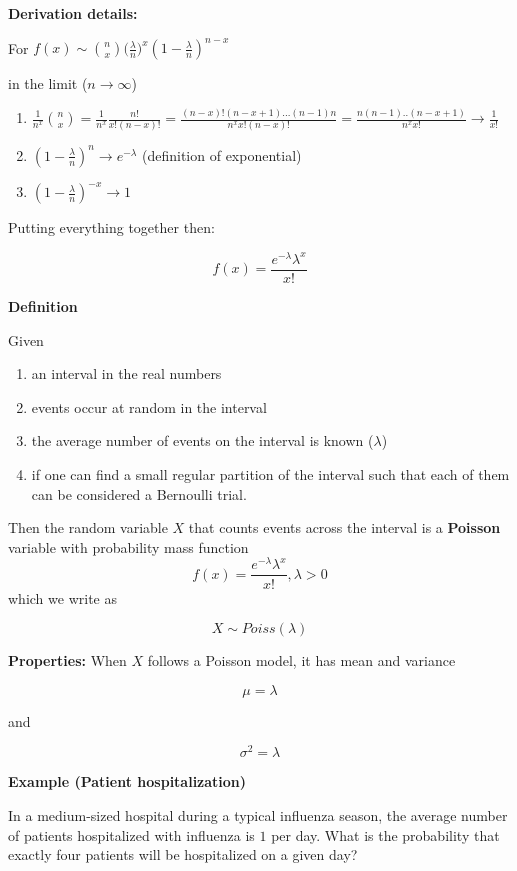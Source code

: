 \documentclass[
]{book}
\providecommand{\tightlist}{%
  \setlength{\itemsep}{0pt}\setlength{\parskip}{0pt}}
\begin{document}
\textbf{Derivation details:}

For \(f(x) \sim \binom n x \big(\frac{\lambda}{n}\big)^x(1-\frac{\lambda}{n})^{n-x}\)

in the limit (\(n \rightarrow \infty\))

\begin{enumerate}
\def\labelenumi{\arabic{enumi})}
\tightlist
\item
  \(\frac{1}{n^x}\binom n x =\frac{1}{n^x}\frac{n!}{x! (n-x)!}=\frac{(n-x)!(n-x+1)...(n-1)n}{n^x x! (n-x)!}=\frac{n(n-1)..(n-x+1)}{n^x x!} \rightarrow \frac{1}{x!}\)
\item
  \((1-\frac{\lambda}{n})^{n} \rightarrow e^{-\lambda}\) (definition of exponential)
\item
  \((1-\frac{\lambda}{n})^{-x} \rightarrow 1\)
\end{enumerate}

Putting everything together then:

\[f(x)= \frac{e^{-\lambda}\lambda^x}{x!}\]

\textbf{Definition}

Given

\begin{enumerate}
\def\labelenumi{\arabic{enumi})}
\tightlist
\item
  an interval in the real numbers
\item
  events occur at random in the interval
\item
  the average number of events on the interval is known (\(\lambda\))
\item
  if one can find a small regular partition of the interval such that each of them can be considered a Bernoulli trial.
\end{enumerate}

Then the random variable \(X\) that counts events across the interval is a \textbf{Poisson} variable with probability mass function\\
\[f(x)= \frac{e^{-\lambda}\lambda^x}{x!}, \lambda>0\]
which we write as

\[X \sim Poiss(\lambda)\]

\textbf{Properties:}
When \(X\) follows a Poisson model, it has mean and variance

\[\mu= \lambda\]

and

\[\sigma^2= \lambda\]

\textbf{Example (Patient hospitalization)}

In a medium-sized hospital during a typical influenza season, the average number of patients hospitalized with influenza is \(1\) per day. What is the probability that exactly four patients will be hospitalized on a given day?
\end{document}
